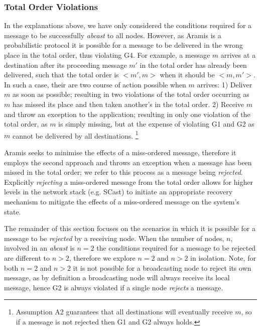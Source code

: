 		\subsubsection*{Total Order Violations}\label{ssec:abcast_rejection}
		In the explanations above, we have only considered the conditions required for a message to be successfully \emph{abcast} to all nodes.  However, as \textsf{Aramis} is a probabilistic protocol it is possible for a message to be delivered in the wrong place in the total order, thus violating G4.  For example, a message $m$ arrives at a destination after its proceeding message $m'$ in the total order has already been delivered, such that the total order is $<m', m>$ when it should be $<m, m'>$.  In such a case, their are two course of action possible when $m$ arrives: 1) Deliver $m$ as soon as possible; resulting in two violations of the total order occurring as $m$ has missed its place and then taken another's in the total order.  2) Receive $m$ and throw an exception to the application; resulting in only one violation of the total order, as $m$ is simply missing, but at the expense of violating G1 and G2 as $m$ cannot be delivered by all destinations.  \footnote{Assumption A2 guarantees that all destinations will eventually receive $m$, so if a message is not rejected then G1 and G2 always holds.}
		
		\textsf{Aramis} seeks to minimise the effects of a miss-ordered message, therefore it employs the second approach and throws an exception when a message has been missed in the total order; we refer to this process as a message being \emph{rejected}.  Explicitly \emph{rejecting} a miss-ordered message from the total order allows for higher levels in the network stack (e.g. \textsf{SCast}) to initiate an appropriate recovery mechanism to mitigate the effects of a miss-ordered message on the system's state.  
		
		The remainder of this section focuses on the scenarios in which it is possible for a message to be \emph{rejected} by a receiving node.  When the number of nodes, $n$, involved in an \emph{abcast} is $n=2$ the conditions required for a message to be rejected are different to $n > 2$, therefore we explore $n=2$ and $n>2$ in isolation. Note, for both $n=2$ and $n>2$ it is not possible for a broadcasting node to reject its own message, as by definition a broadcasting node will always receive its local message, hence G2 is always violated if a single node \emph{rejects} a message.  
		
